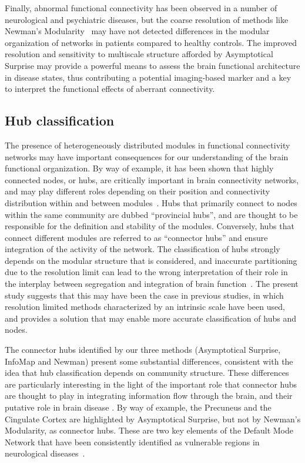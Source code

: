 Finally, abnormal functional connectivity has been observed in a number of neurological and psychiatric diseases, but the coarse resolution of methods like Newman's Modularity~\cite{fornito2015} may have not detected differences in the modular organization of networks in patients compared to healthy controls.
The improved resolution and sensitivity to multiscale structure afforded by Asymptotical Surprise may provide a powerful means to assess the brain functional architecture in disease states, thus contributing a potential imaging-based marker and a key to interpret the functional effects of aberrant connectivity.
\subsection{Hub classification}
The presence of heterogeneously distributed modules in functional connectivity networks may have important consequences for our understanding of the brain functional organization.
By way of example, it has been shown that highly connected nodes, or hubs, are critically important in brain connectivity networks, and may play different roles depending on their position and connectivity distribution within and between modules~\cite{bullmore2009}.
Hubs that primarily connect to nodes within the same community are dubbed “provincial hubs”, and are thought to be responsible for the definition and stability of the modules.
Conversely, hubs that connect different modules are referred to as “connector hubs” and ensure integration of the activity of the network.
The classification of hubs strongly depends on the modular structure that is considered, and inaccurate partitioning due to the resolution limit can lead to the wrong interpretation of their role in the interplay between segregation and integration of brain function~\cite{bullmore2009}.
The present study suggests that this may have been the case in previous studies, in which resolution limited methods characterized by an intrinsic scale have been used, and provides a solution that may enable more accurate classification of hubs and nodes.

The connector hubs identified by our three methods (Asymptotical Surprise, InfoMap and Newman) present some substantial differences, consistent with the idea that hub classification depends on community structure.
These differences are particularly interesting in the light of the important role that connector hubs are thought to play in integrating information flow through the brain, and their putative role in brain disease \cite{crossley2014,stam2014}.
By way of example, the Precuneus and the Cingulate Cortex are highlighted by Asymptotical Surprise, but not by Newman's Modularity, as connector hubs.
These are two key elements of the Default Mode Network that have been consistently identified as vulnerable regions in neurological diseases~\cite{vandenheuvel2013a,buckner2009}.

